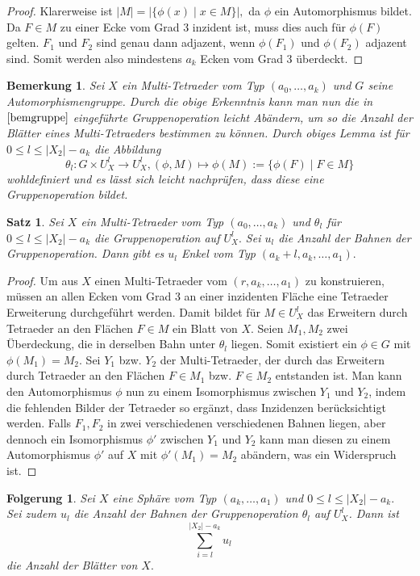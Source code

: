 \documentclass[12pt,titlepage,twoside,cleardoublepage]{article}
\theoremstyle{nummermitklammern}
\newtheorem{folgerung}[temp]{Folgerung}
\newtheorem{bemerkung}[temp]{Bemerkung}
\newtheorem{satz}[temp]{Satz}
\newtheorem{folgerung}[zahl]{Folgerung}
\newtheorem{bemerkung}[zahl]{Bemerkung}
\newtheorem{satz}[zahl]{Satz}
\numberwithin{equation}{section}
\begin{document}
\begin{proof}
Klarerweise ist $\vert M\vert =\vert\{\phi(x)\mid x\in M\}\vert,$ da $\phi$ ein Automorphismus bildet.
 Da $F\in M$ zu einer Ecke vom Grad 3 inzident ist, muss dies auch für $\phi(F)$ gelten. $F_1$ und $ F_2$ sind genau dann adjazent, wenn $\phi(F_1)$ und $\phi(F_2)$ adjazent sind. Somit werden also mindestens $a_k$ Ecken vom Grad 3 überdeckt. 
\end{proof}
\begin{bemerkung}
Sei $X$ ein Multi-Tetraeder vom Typ $(a_0,\ldots ,a_k)$ und $G$ seine Automorphismengruppe.
Durch die obige Erkenntnis kann man nun die in $\Cref{bemgruppe}$ eingeführte Gruppenoperation leicht Abändern, um so die Anzahl der Blätter eines Multi-Tetraeders bestimmen zu können. Durch obiges Lemma ist für $0\leq l\leq \vert X_2 \vert -a_k$ die Abbildung
\[
\theta_l: G\times U_X^l \to U_X^l, (\phi, M)\mapsto \phi(M):=\{\phi(F)\mid F\in M\}
\] 
wohldefiniert und es lässt sich leicht nachprüfen, dass diese eine Gruppenoperation bildet.
\end{bemerkung}
\begin{satz}
Sei $X$ ein Multi-Tetraeder vom Typ $(a_0,\ldots,a_k)$ und $\theta_l$ für $0\leq l\leq \vert X_2\vert -a_k$ die Gruppenoperation auf $U_X^l.$ Sei $u_l$ die Anzahl der Bahnen der Gruppenoperation. Dann gibt es $u_l$ Enkel vom Typ $(a_k+l,a_k,\ldots,a_1).$
\end{satz}
\begin{proof}
Um aus $X$ einen Multi-Tetraeder vom $(r,a_k,\ldots,a_1)$ zu konstruieren, müssen an allen Ecken vom Grad 3 an einer inzidenten Fläche eine Tetraeder Erweiterung durchgeführt werden. Damit bildet für $M\in U_X^l$ das Erweitern durch Tetraeder an den Flächen $F\in M$ ein Blatt von $X$. Seien $M_1,M_2$ zwei Überdeckung, die in derselben Bahn unter $\theta_l$ liegen. Somit existiert ein $\phi \in G$ mit $\phi(M_1)=M_2.$ Sei $Y_1$ bzw. $Y_2$ der Multi-Tetraeder, der durch das Erweitern durch Tetraeder an den Flächen $F\in M_1$ bzw. $F \in M_2$ entstanden ist. Man kann den Automorphismus $\phi$ nun zu einem Isomorphismus zwischen $Y_1$ und $Y_2$, indem die fehlenden Bilder der Tetraeder so ergänzt, dass Inzidenzen berücksichtigt werden. Falls $F_1,F_2$ in zwei verschiedenen verschiedenen Bahnen liegen, aber dennoch ein Isomorphismus $\phi'$ zwischen $Y_1$ und $Y_2$ kann man diesen zu einem Automorphismus $\phi'$ auf $X$ mit $\phi'(M_1)=M_2$ abändern, was ein Widerspruch ist.
\end{proof}
\begin{folgerung}
Sei $X$ eine Sphäre vom Typ $(a_k,\ldots, a_1)$ und $0\leq l\leq \vert X_2\vert -a_k.$ Sei zudem $u_l$ die Anzahl der Bahnen der Gruppenoperation $\theta_l$ auf $U_X^l$. Dann ist 
\[
\sum_{i=l}^{\vert X_2\vert -a_k} u_l
\] die Anzahl der Blätter von $X.$
\end{folgerung}
\end{document}
